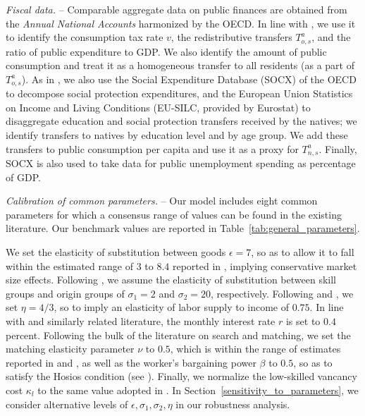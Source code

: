 \documentclass[a4paper,12pt]{article}
\begin{document}
\emph{Fiscal data.} -- Comparable aggregate data on public finances are obtained from the \textit{Annual National Accounts} harmonized by the OECD. In line with \citet{Burzynski2018}, we use it to identify the consumption tax rate $v$, the redistributive transfers $T^a_{o,s}$, and the ratio of public expenditure to GDP. We  also  identify  the  amount  of  public  consumption  and  treat  it  as a  homogeneous  transfer  to  all  residents  (as  a  part  of $T^a_{o,s}$). As in \citet{Aubry2016},  we also use the Social Expenditure Database (SOCX) of the OECD to decompose social protection expenditures, and the European Union Statistics on Income and Living Conditions (EU-SILC, provided by Eurostat) to disaggregate education and social protection transfers received by the natives; we identify transfers to natives by education level and by age group. We add these transfers to public consumption per capita and  use  it  as  a  proxy  for $T^a_{n,s}$. Finally, SOCX is also used to take data for public unemployment spending as percentage of GDP.

\emph{Calibration of common parameters.} -- Our model includes eight common parameters for which a consensus range of values can be found in the existing literature. Our benchmark values are reported in Table~\ref{tab:general_parameters}.

We set the elasticity of substitution between goods $\epsilon=7$, so as to allow it to fall within the estimated range of $3$ to $8.4$ reported in \citet{Feenstra1994}, implying conservative market size effects. Following \citet{Ottaviano2012}, we assume the elasticity of substitution between skill groups and origin groups of $\sigma_1 =2$ and $\sigma_2 =20$, respectively. Following \citet{ChettyEtAl2011} and \citet{RogersonWallenius2013}, we set $\eta=4/3$, so to imply an elasticity of labor supply to income of $0.75$. In line with \citet{Chassamboulli2014} and similarly related literature, the monthly interest rate $r$ is set to $0.4$ percent. Following the bulk of the literature on search and matching, we set the matching elasticity parameter $\nu$ to $0.5$, which is within the range of estimates reported in \citet{Petrongolo2001} and \citet{Mortensen2007}, as well as the worker's bargaining power $\beta$ to $0.5$, so as to satisfy the Hosios condition (see \cite{Hosios1990}). Finally, we normalize the low-skilled vancancy cost $\kappa_l$ to the same value adopted in \citet{Chassamboulli2014}. In Section~\ref{sensitivity_to_parameters}, we consider alternative levels of $\epsilon, \sigma_1,\sigma_2, \eta$ in our robustness analysis.
\end{document}
